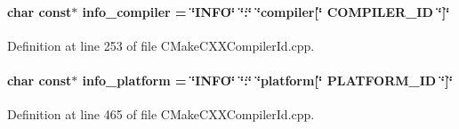 \paragraph[{info\+\_\+compiler}]{\setlength{\rightskip}{0pt plus 5cm}char const$\ast$ info\+\_\+compiler = \char`\"{}I\+N\+F\+O\char`\"{} \char`\"{}\+:\char`\"{} \char`\"{}compiler\mbox{[}\char`\"{} C\+O\+M\+P\+I\+L\+E\+R\+\_\+\+I\+D \char`\"{}\mbox{]}\char`\"{}}\label{a00098_a4b0efeb7a5d59313986b3a0390f050f6}


Definition at line 253 of file C\+Make\+C\+X\+X\+Compiler\+Id.\+cpp.

\hypertarget{a00098_a2321403dee54ee23f0c2fa849c60f7d4}{}
\paragraph[{info\+\_\+platform}]{\setlength{\rightskip}{0pt plus 5cm}char const$\ast$ info\+\_\+platform = \char`\"{}I\+N\+F\+O\char`\"{} \char`\"{}\+:\char`\"{} \char`\"{}platform\mbox{[}\char`\"{} P\+L\+A\+T\+F\+O\+R\+M\+\_\+\+I\+D \char`\"{}\mbox{]}\char`\"{}}\label{a00098_a2321403dee54ee23f0c2fa849c60f7d4}


Definition at line 465 of file C\+Make\+C\+X\+X\+Compiler\+Id.\+cpp.

